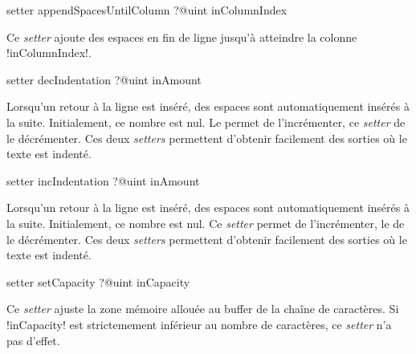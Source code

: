 
\begin{galgasbox}
setter appendSpacesUntilColumn ?@uint inColumnIndex
\end{galgasbox}

Ce \emph{setter} ajoute des espaces en fin de ligne jusqu'à atteindre la colonne \ggs!inColumnIndex!.





\begin{galgasbox}
setter decIndentation ?@uint inAmount
\end{galgasbox}

Lorsqu'un retour à la ligne est inséré, des espaces sont automatiquement insérés à la suite. Initialement, ce nombre est nul. Le  permet de l'incrémenter, ce \emph{setter} de le décrémenter. Ces deux \emph{setters} permettent d'obtenir facilement des sorties où le texte est indenté.






\begin{galgasbox}
setter incIndentation ?@uint inAmount
\end{galgasbox}

Lorsqu'un retour à la ligne est inséré, des espaces sont automatiquement insérés à la suite. Initialement, ce nombre est nul. Ce \emph{setter} permet de l'incrémenter, le  de le décrémenter. Ces deux \emph{setters} permettent d'obtenir facilement des sorties où le texte est indenté.









\begin{galgasbox}
setter setCapacity ?@uint inCapacity
\end{galgasbox}


Ce \emph{setter} ajuste la zone mémoire allouée au buffer de la chaîne de caractères. Si \ggs!inCapacity! est strictemement inférieur au nombre de caractères, ce \emph{setter} n'a pas d'effet.










